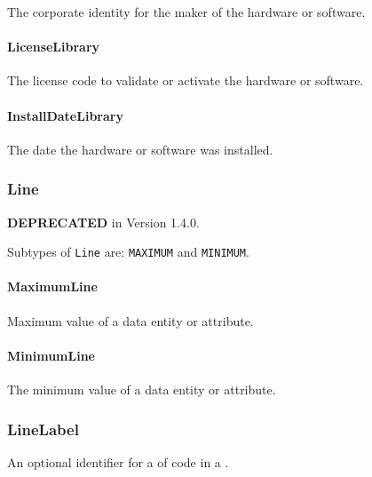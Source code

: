 The corporate identity for the maker of the hardware or software.



\paragraph{LicenseLibrary}\mbox{}
\label{sec:LicenseLibrary}



The license code to validate or activate the hardware or software.


\paragraph{InstallDateLibrary}\mbox{}
\label{sec:InstallDateLibrary}



The date the hardware or software was installed.


\subsubsection{Line}
\label{sec:Line}



\textbf{DEPRECATED} in Version 1.4.0.


Subtypes of \texttt{Line} are: \texttt{MAXIMUM} and \texttt{MINIMUM}. 
\FloatBarrier

\paragraph{MaximumLine}\mbox{}
\label{sec:MaximumLine}



Maximum value of a data entity or attribute.


\paragraph{MinimumLine}\mbox{}
\label{sec:MinimumLine}



The minimum value of a data entity or attribute.


\subsubsection{LineLabel}
\label{sec:LineLabel}



An optional identifier for a  of code in a .

